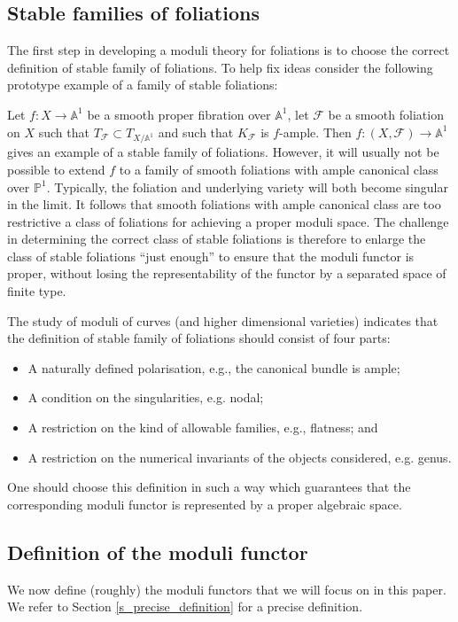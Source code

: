 \documentclass[12pt, a4paper]{amsart}
\theoremstyle{definition}
\theoremstyle{named}
\begin{document}
\medskip

\subsection{Stable families of foliations} 
The first step in developing a moduli theory for foliations is to choose the correct definition of stable family of foliations.  
To help fix ideas consider the following prototype example of a family of stable foliations:

Let $f\colon X \to \mathbb A^1$ be a smooth proper fibration over $\mathbb A^1$, let $\mathcal F$ be a smooth foliation on $X$ such that $T_{\mathcal F} \subset T_{X/\mathbb A^1}$ and such that $K_{\mathcal F}$ is $f$-ample.  Then $f\colon (X, \mathcal F) \to \mathbb A^1$ gives an example of a stable family of foliations.  
However, it will usually not be possible to extend $f$ to a family of smooth foliations with ample canonical class over $\mathbb P^1$. Typically, the foliation and underlying variety will both become singular in the limit.
It follows that smooth foliations with ample canonical class are too restrictive a class of foliations for achieving a proper moduli space.
The challenge in determining the correct class of stable foliations is therefore to 
enlarge the class of stable foliations ``just enough'' to ensure that the moduli functor is proper, without losing the representability of the functor by a separated space of finite type.



The study of moduli of curves (and higher dimensional varieties) indicates  that the definition of stable family of foliations should consist of four parts:
\begin{itemize}
    \item A naturally defined polarisation, e.g., the canonical bundle is ample;
    \item A condition on the singularities, e.g. nodal;
    \item A restriction on the kind of allowable families, e.g., flatness; and 
    \item A restriction on the numerical invariants of the objects considered, e.g. genus.
\end{itemize}
One should choose this definition in such a way which guarantees that the corresponding moduli functor is represented by a proper algebraic space.

\subsection{Definition of the moduli functor}
\label{s_intro_def_mod_functor}
We now define (roughly) the moduli functors that we will focus on in this paper.  We refer to Section \ref{s_precise_definition} for a precise definition.
\end{document}
